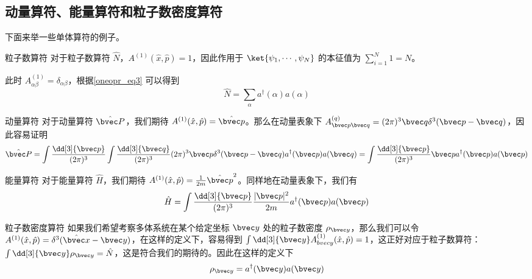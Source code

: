 \subsection{动量算符、能量算符和粒子数密度算符}
下面来举一些单体算符的例子。
\begin{example}{粒子数算符}
对于粒子数算符 $\hat N$，$A^{(1)}(\hat x,\hat p)=1$，因此作用于 $\ket{\psi_1,\cdots,\psi_N}$ 的本征值为 $\sum_{i=1}^N 1=N$。

此时 $A_{\alpha\beta}^{(1)}=\delta_{\alpha\beta}$，根据\autoref{oneopr_eq3} 可以得到
\begin{equation}
\hat N=\sum_{\alpha} a^\dagger(\alpha) a(\alpha)
\end{equation}

\end{example}

\begin{example}{动量算符}
对于动量算符 $\hat{\bvec P}$，我们期待 $A^{(1)}(\hat x,\hat p)=\hat{\bvec p}$。那么在动量表象下 $A_{\bvec p\bvec q}^{(q)}=(2\pi)^3 \bvec q \delta^3(\bvec p-\bvec q)$，因此容易证明
\begin{equation}
\begin{aligned}
\hat{\bvec P}=\int\frac{\dd[3]{\bvec p}}{(2\pi)^3} \int\frac{\dd[3]{\bvec q}}{(2\pi)^3} (2\pi)^3 \bvec p \delta^3(\bvec p-\bvec q)a^\dagger(\bvec p)a(\bvec q)=\int\frac{\dd[3]{\bvec p}}{(2\pi)^3} \bvec p a^\dagger(\bvec p)a(\bvec p)
\end{aligned}
\end{equation}
\end{example}



\begin{example}{能量算符}
对于能量算符 $\hat H$，我们期待 $A^{(1)}(\hat x,\hat p)=\frac{1}{2m}\hat{\bvec p}^2$。同样地在动量表象下，我们有
\begin{equation}
\begin{aligned}
\hat{H}=\int\frac{\dd[3]{\bvec p}}{(2\pi)^3} \frac{|\bvec p|^2}{2m} a^\dagger(\bvec p)a(\bvec p)
\end{aligned}
\end{equation}
\end{example}

\begin{example}{粒子数密度算符}
如果我们希望考察多体系统在某个给定坐标 $\bvec y$ 处的粒子数密度 $\rho_{\bvec y}$，那么我们可以令 $A^{(1)}(\hat x,\hat p)=\delta^3(\hat{\bvec x}-\bvec y)$，在这样的定义下，容易得到 $\int \dd[3]{\bvec y} A^{(1)}_{\\bvec y}(\hat x,\hat p)=1$，这正好对应于粒子数算符：$\int \dd[3]{\bvec y} \rho_{\bvec y}=\hat N$，这是符合我们的期待的。因此在这样的定义下
\begin{equation}
\rho_{\bvec y}=a^\dagger(\bvec y)a(\bvec y)
\end{equation}

\end{example}